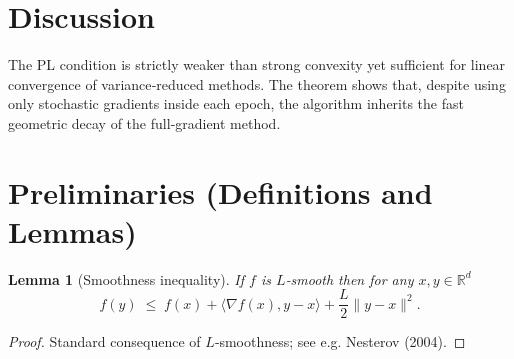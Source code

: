 \documentclass[11pt]{article}
\newtheorem{lemma}{Lemma}
\newcommand{\RR}{\mathbb{R}}
\begin{document}
\section*{Discussion}
The PL condition is strictly weaker than strong convexity yet sufficient for linear convergence of variance‑reduced methods. The theorem shows that, despite using only stochastic gradients inside each epoch, the algorithm inherits the fast geometric decay of the full‑gradient method.

\section*{Preliminaries (Definitions and Lemmas)}
\begin{lemma}[Smoothness inequality]\label{lem:smooth}
If $f$ is $L$‑smooth then for any $x,y\in\RR^{d}$
\[
f(y)\;\le\;f(x)+\langle\nabla f(x),y-x\rangle+\frac{L}{2}\|y-x\|^{2}.
\tag{5}
\]
\end{lemma}
\begin{proof}
Standard consequence of $L$‑smoothness; see e.g. Nesterov (2004). \qedhere
\end{proof}
\end{document}
